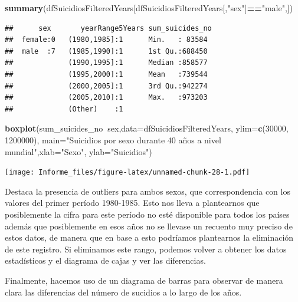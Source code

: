 \documentclass[]{article}
\newenvironment{Shaded}{\begin{snugshade}}{\end{snugshade}}
\newcommand{\DataTypeTok}[1]{\textcolor[rgb]{0.13,0.29,0.53}{#1}}
\newcommand{\DecValTok}[1]{\textcolor[rgb]{0.00,0.00,0.81}{#1}}
\newcommand{\KeywordTok}[1]{\textcolor[rgb]{0.13,0.29,0.53}{\textbf{#1}}}
\newcommand{\NormalTok}[1]{#1}
\newcommand{\OperatorTok}[1]{\textcolor[rgb]{0.81,0.36,0.00}{\textbf{#1}}}
\newcommand{\StringTok}[1]{\textcolor[rgb]{0.31,0.60,0.02}{#1}}
\begin{document}
\begin{Shaded}
\begin{Highlighting}[]
\KeywordTok{summary}\NormalTok{(dfSuicidiosFilteredYears[dfSuicidiosFilteredYears[,}\StringTok{"sex"}\NormalTok{]}\OperatorTok{==}\StringTok{"male"}\NormalTok{,])}
\end{Highlighting}
\end{Shaded}

\begin{verbatim}
##      sex       yearRange5Years sum_suicides_no 
##  female:0   (1980,1985]:1      Min.   : 83584  
##  male  :7   (1985,1990]:1      1st Qu.:688450  
##             (1990,1995]:1      Median :858577  
##             (1995,2000]:1      Mean   :739544  
##             (2000,2005]:1      3rd Qu.:942274  
##             (2005,2010]:1      Max.   :973203  
##             (Other)    :1
\end{verbatim}

\begin{Shaded}
\begin{Highlighting}[]
\KeywordTok{boxplot}\NormalTok{(sum_suicides_no}\OperatorTok{~}\NormalTok{sex,}\DataTypeTok{data=}\NormalTok{dfSuicidiosFilteredYears, }\DataTypeTok{ylim=}\KeywordTok{c}\NormalTok{(}\DecValTok{30000}\NormalTok{, }\DecValTok{1200000}\NormalTok{), }\DataTypeTok{main=}\StringTok{"Suicidios por sexo durante 40 años a nivel mundial"}\NormalTok{,}\DataTypeTok{xlab=}\StringTok{"Sexo"}\NormalTok{, }\DataTypeTok{ylab=}\StringTok{"Suicidios"}\NormalTok{)}
\end{Highlighting}
\end{Shaded}

\texttt{[image: Informe\_files/figure-latex/unnamed-chunk-28-1.pdf]}

Destaca la presencia de outliers para ambos sexos, que correspondencia
con los valores del primer período 1980-1985. Esto nos lleva a
plantearnos que posiblemente la cifra para este período no esté
disponible para todos los países además que posiblemente en esos años no
se llevase un recuento muy preciso de estos datos, de manera que en base
a esto podríamos plantearnos la eliminación de este registro. Si
eliminamos este rango, podemos volver a obtener los datos estadísticos y
el diagrama de cajas y ver las diferencias.

Finalmente, hacemos uso de un diagrama de barras para observar de manera
clara las diferencias del número de sucidios a lo largo de los años.
\end{document}
